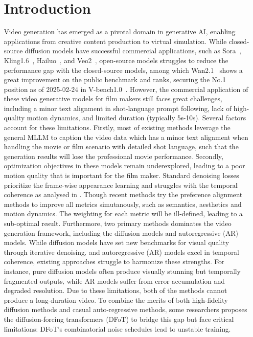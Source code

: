 \documentclass{article}
\begin{document}
\section{Introduction}
Video generation has emerged as a pivotal domain in generative AI, enabling applications from creative content production to virtual simulation. While closed-source diffusion models have successful commercial applications, such as Sora~\cite{openai2024video}, Kling1.6~\cite{kuaishou2024kling}, Hailuo~\cite{minimax2024hailuo}, and Veo2~\cite{deepmind2024veo2}, open-source models struggles to reduce the performance gap with the closed-source models, among which Wan2.1~\cite{wan2025} shows a great improvement on the public benchmark and ranks, securing the No.1 position as of 2025-02-24 in V-bench1.0~\cite{huang2023vbench}. However, the commercial application of these video generative models 
for film makers still faces great challenges, including a minor text alignment in shot-language prompt following, lack of high-quality motion dynamics, and limited duration (typically 5s-10s). Several factors account for these limitations. Firstly, most of existing methods leverage the general MLLM to caption the video data which has a minor text alignment when handling the movie or film scenario with detailed shot language, such that the generation results will lose the professional movie performance. 
Secondly, optimization objectives in these models remain underexplored, leading to a poor motion quality that is important for the film maker. Standard denoising losses prioritize the frame-wise appearance learning and struggles with the temporal coherence as analysed in \cite{videoJam}. Though recent methods try the preference alignment methods to improve all metrics simutanously, such as semantics, aesthetics and motion dynamics. The weighting for each metric will be ill-defined, leading to a sub-optimal result. Furthermore, two primary methods dominates the video generation framework, including the diffusion models and autoregressive (AR) models. While diffusion models have set new benchmarks for visual quality through iterative denoising, and autoregressive (AR) models excel in temporal coherence, existing approaches struggle to harmonize these strengths. For instance, pure diffusion models often produce visually stunning but temporally fragmented outputs, while AR models suffer from error accumulation and degraded resolution. Due to these limitations, both of the methods cannot produce a long-duration video. To combine the merits of both high-fidelity diffusion methods and casual auto-regressive methods, some researchers proposes the diffusion-forcing transformers (DFoT) to bridge this gap but face critical limitations: DFoT’s combinatorial noise schedules lead to unstable training. 
\end{document}
